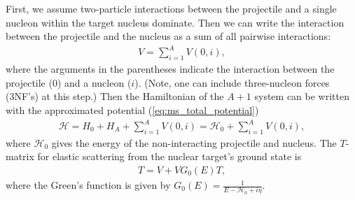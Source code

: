 \documentclass[preprintnumbers,floatfix,aps,prc,preprint,nofootinbib]{revtex4-1}
\begin{document}
First, we assume two-particle interactions between the projectile and a single nucleon within the target nucleus dominate. Then we can write the interaction between the projectile and the nucleus as a sum of all pairwise interactions:
%
\begin{eqnarray}
	\label{eq:ms_total_potential}
	V = \sum_{i=1}^A V(0, i),
\end{eqnarray}
%
where the arguments in the parentheses indicate the interaction between the projectile ($0$) and a nucleon ($i$). (Note, one can include three-nucleon forces (3NF's) at this step.) Then the Hamiltonian of the $A+1$ system can be written with the approximated potential (\ref{eq:ms_total_potential})
%
\begin{eqnarray}
	\label{eq:ms_hamiltonian}
	\mathcal{H} = H_0 + H_A + \sum_{i=1}^A V(0, i) = \mathcal{H}_0 + \sum_{i=1}^A V(0, i),
\end{eqnarray}
%
where $\mathcal{H}_0$ gives the energy of the non-interacting projectile and nucleus. The $T$-matrix for elastic scattering from the nuclear target's ground state is
%
\begin{eqnarray}
	\label{eq:tmatrix}
	T = V + V G_0(E) T,
\end{eqnarray}
%
where the Green's function is given by $G_0(E) = \frac{1}{E - \mathcal{H}_0 + i \eta}$.
\\
\end{document}
